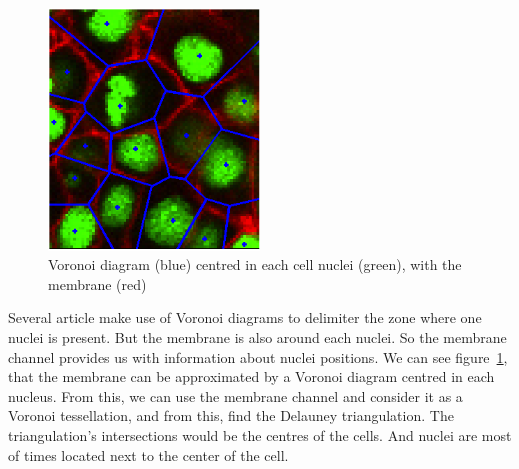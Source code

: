 \begin{figure}[h]
\begin{center}
\leavevmode
\includegraphics[width=0.5\textwidth]{pictures/voronoiExample2D}
\end{center}
\caption{Voronoi diagram (blue) centred in each cell nuclei (green), with the membrane (red)}
\label{fig:voronoiExample2D}
\end{figure}
Several article make use of Voronoi diagrams to delimiter the zone where one nuclei is present.
But the membrane is also around each nuclei. So the membrane channel provides us with information about nuclei positions.
We can see figure~\ref{fig:voronoiExample2D}, that the membrane can be approximated by a Voronoi diagram centred in each nucleus.
From this, we can use the membrane channel and consider it as a Voronoi tessellation, and from this, find the Delauney triangulation.
The triangulation's intersections would be the centres of the cells. And nuclei are most of times located next to the center of the cell.

\paragraph*{}



